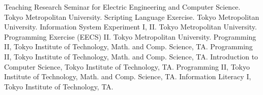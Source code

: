 \begin{rubric}{Teaching}
  \entry*[2024] Research Seminar for Electric Engineering and Computer Science. Tokyo Metropolitan University.
  \entry*[2024] Scripting Language Exercise. Tokyo Metropolitan University.
  \entry*[2024] Information System Experiment I, II. Tokyo Metropolitan University.
  \entry*[2024] Programming Exercise (EECS) II. Tokyo Metropolitan University.
  \entry*[2020] Programming II, Tokyo Institute of Technology, Math. and
  Comp. Science, TA.
  \entry*[2019] Programming II, Tokyo Institute of Technology, Math. and
  Comp. Science, TA.
  \entry*[2019] Introduction to Computer Science, Tokyo Institute of Technology, TA.
  \entry*[2018] Programming II, Tokyo Institute of Technology, Math. and
  Comp. Science, TA.
  \entry*[2018] Information Literacy I, Tokyo Institute of Technology, TA.
\end{rubric}
